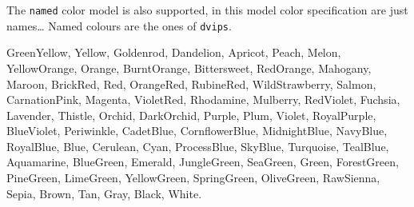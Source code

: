 The \texttt{named} color model is also supported, in this model color
specification are just names\ldots{}
Named colours are the ones of \texttt{dvips}.
\begin{flushleft}
\renewcommand{\textcolor}[3][]{#3}
\textcolor[named]{GreenYellow}{GreenYellow},
\textcolor[named]{Yellow}{Yellow},
\textcolor[named]{Goldenrod}{Goldenrod},
\textcolor[named]{Dandelion}{Dandelion},
\textcolor[named]{Apricot}{Apricot},
\textcolor[named]{Peach}{Peach},
\textcolor[named]{Melon}{Melon},
\textcolor[named]{YellowOrange}{YellowOrange},
\textcolor[named]{Orange}{Orange},
\textcolor[named]{BurntOrange}{BurntOrange},
\textcolor[named]{Bittersweet}{Bittersweet},
\textcolor[named]{RedOrange}{RedOrange},
\textcolor[named]{Mahogany}{Mahogany},
\textcolor[named]{Maroon}{Maroon},
\textcolor[named]{BrickRed}{BrickRed},
\textcolor[named]{Red}{Red},
\textcolor[named]{OrangeRed}{OrangeRed},
\textcolor[named]{RubineRed}{RubineRed},
\textcolor[named]{WildStrawberry}{WildStrawberry},
\textcolor[named]{Salmon}{Salmon},
\textcolor[named]{CarnationPink}{CarnationPink},
\textcolor[named]{Magenta}{Magenta},
\textcolor[named]{VioletRed}{VioletRed},
\textcolor[named]{Rhodamine}{Rhodamine},
\textcolor[named]{Mulberry}{Mulberry},
\textcolor[named]{RedViolet}{RedViolet},
\textcolor[named]{Fuchsia}{Fuchsia},
\textcolor[named]{Lavender}{Lavender},
\textcolor[named]{Thistle}{Thistle},
\textcolor[named]{Orchid}{Orchid},
\textcolor[named]{DarkOrchid}{DarkOrchid},
\textcolor[named]{Purple}{Purple},
\textcolor[named]{Plum}{Plum},
\textcolor[named]{Violet}{Violet},
\textcolor[named]{RoyalPurple}{RoyalPurple},
\textcolor[named]{BlueViolet}{BlueViolet},
\textcolor[named]{Periwinkle}{Periwinkle},
\textcolor[named]{CadetBlue}{CadetBlue},
\textcolor[named]{CornflowerBlue}{CornflowerBlue},
\textcolor[named]{MidnightBlue}{MidnightBlue},
\textcolor[named]{NavyBlue}{NavyBlue},
\textcolor[named]{RoyalBlue}{RoyalBlue},
\textcolor[named]{Blue}{Blue},
\textcolor[named]{Cerulean}{Cerulean},
\textcolor[named]{Cyan}{Cyan},
\textcolor[named]{ProcessBlue}{ProcessBlue},
\textcolor[named]{SkyBlue}{SkyBlue},
\textcolor[named]{Turquoise}{Turquoise},
\textcolor[named]{TealBlue}{TealBlue},
\textcolor[named]{Aquamarine}{Aquamarine},
\textcolor[named]{BlueGreen}{BlueGreen},
\textcolor[named]{Emerald}{Emerald},
\textcolor[named]{JungleGreen}{JungleGreen},
\textcolor[named]{SeaGreen}{SeaGreen},
\textcolor[named]{Green}{Green},
\textcolor[named]{ForestGreen}{ForestGreen},
\textcolor[named]{PineGreen}{PineGreen},
\textcolor[named]{LimeGreen}{LimeGreen},
\textcolor[named]{YellowGreen}{YellowGreen},
\textcolor[named]{SpringGreen}{SpringGreen},
\textcolor[named]{OliveGreen}{OliveGreen},
\textcolor[named]{RawSienna}{RawSienna},
\textcolor[named]{Sepia}{Sepia},
\textcolor[named]{Brown}{Brown},
\textcolor[named]{Tan}{Tan},
\textcolor[named]{Gray}{Gray},
\textcolor[named]{Black}{Black},
\textcolor[named]{White}{White}.
\end{flushleft}

